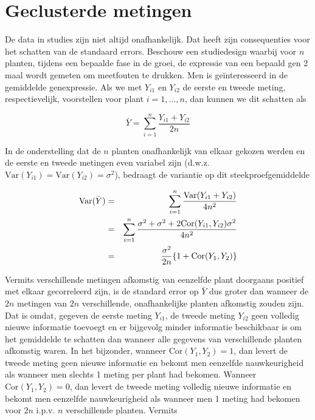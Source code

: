 \documentclass[
  12pt,dutch,coursenotes]{book}
\begin{document}
\hypertarget{geclusterde-metingen}{%
\section{Geclusterde metingen}\label{geclusterde-metingen}}

De data in studies zijn niet altijd onafhankelijk. Dat heeft zijn consequenties voor het schatten van de standaard errors.
Beschouw een studiedesign waarbij voor \(n\) planten, tijdens een bepaalde fase in de groei, de expressie van een bepaald gen 2 maal wordt gemeten om meetfouten te drukken. Men is geïnteresseerd in de gemiddelde genexpressie.
Als we met \(Y_{i1}\) en \(Y_{i2}\) de eerste en tweede meting, respectievelijk, voorstellen
voor plant \(i=1,...,n\), dan kunnen we dit schatten als

\begin{equation*}
\bar Y = \sum_{i=1}^n \frac{Y_{i1}+Y_{i2}}{2n}
\end{equation*}

In de onderstelling dat de \(n\) planten onafhankelijk van elkaar gekozen
werden en de eerste en tweede metingen even variabel zijn (d.w.z. \(\text{Var}(Y_{i1})=\text{Var}(Y_{i2})=\sigma^2\)), bedraagt de variantie op dit
steekproefgemiddelde

\begin{eqnarray*}
\text{Var}(\bar Y)&=&\sum_{i=1}^n \frac{\text{Var}(Y_{i1}+Y_{i2})}{4n^2} \\
&=&\sum_{i=1}^n \frac{\sigma^2+\sigma^2+2\text{Cor}(Y_{i1},Y_{i2})\sigma^2}{%
4n^2} \\
&=&\frac{\sigma^2}{2n}\{1+\text{Cor}(Y_{1},Y_{2})\}
\end{eqnarray*}

Vermits verschillende metingen afkomstig van eenzelfde plant doorgaans
positief met elkaar gecorreleerd zijn, is de standard error op \(\bar Y\) dus
groter dan wanneer de \(2n\) metingen van \(2n\) verschillende, onafhankelijke
planten afkomstig zouden zijn. Dat is omdat, gegeven de eerste meting \(Y_{i1}\), de tweede meting \(Y_{i2}\) geen volledig nieuwe informatie toevoegt en er bijgevolg minder informatie beschikbaar is om het gemiddelde te
schatten dan wanneer alle gegevens van verschillende planten afkomstig
waren. In het bijzonder, wanneer \(\text{Cor}(Y_{1},Y_{2})=1\), dan levert de tweede meting geen nieuwe informatie en bekomt men eenzelfde nauwkeurigheid als wanneer men slechts 1 meting per plant had bekomen. Wanneer \(\text{Cor}(Y_{1},Y_{2})=0\), dan levert de tweede meting volledig nieuwe informatie en bekomt men eenzelfde nauwkeurigheid als wanneer men 1 meting had bekomen voor \(2n\) i.p.v. \(n\) verschillende planten. Vermits
\end{document}
